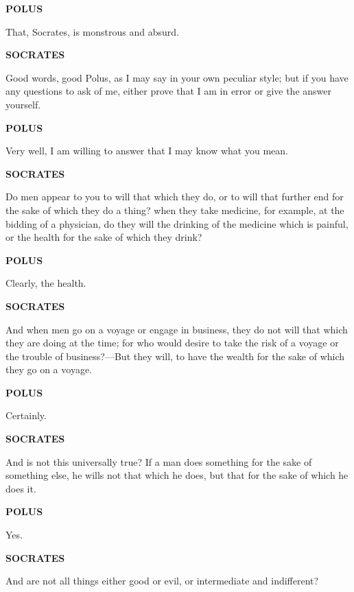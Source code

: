 \documentclass[11pt,letter]{article}
\begin{document}
\par \textbf{POLUS}
\par   That, Socrates, is monstrous and absurd.

\par \textbf{SOCRATES}
\par   Good words, good Polus, as I may say in your own peculiar style; but if you have any questions to ask of me, either prove that I am in error or give the answer yourself.

\par \textbf{POLUS}
\par   Very well, I am willing to answer that I may know what you mean.

\par \textbf{SOCRATES}
\par   Do men appear to you to will that which they do, or to will that further end for the sake of which they do a thing? when they take medicine, for example, at the bidding of a physician, do they will the drinking of the medicine which is painful, or the health for the sake of which they drink?

\par \textbf{POLUS}
\par   Clearly, the health.

\par \textbf{SOCRATES}
\par   And when men go on a voyage or engage in business, they do not will that which they are doing at the time; for who would desire to take the risk of a voyage or the trouble of business?—But they will, to have the wealth for the sake of which they go on a voyage.

\par \textbf{POLUS}
\par   Certainly.

\par \textbf{SOCRATES}
\par   And is not this universally true? If a man does something for the sake of something else, he wills not that which he does, but that for the sake of which he does it.

\par \textbf{POLUS}
\par   Yes.

\par \textbf{SOCRATES}
\par   And are not all things either good or evil, or intermediate and indifferent?
\end{document}
